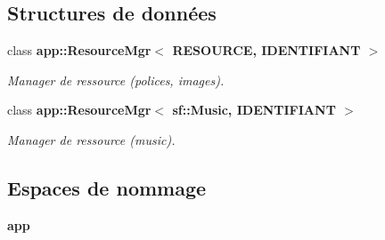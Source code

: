 \subsection*{Structures de données}
\begin{DoxyCompactItemize}
\item 
class {\bf app\+::\+Resource\+Mgr$<$ R\+E\+S\+O\+U\+R\+C\+E, I\+D\+E\+N\+T\+I\+F\+I\+A\+N\+T $>$}
\begin{DoxyCompactList}\small\item\em Manager de ressource (polices, images). \end{DoxyCompactList}\item 
class {\bf app\+::\+Resource\+Mgr$<$ sf\+::\+Music, I\+D\+E\+N\+T\+I\+F\+I\+A\+N\+T $>$}
\begin{DoxyCompactList}\small\item\em Manager de ressource (music). \end{DoxyCompactList}\end{DoxyCompactItemize}
\subsection*{Espaces de nommage}
\begin{DoxyCompactItemize}
\item 
 {\bf app}
\end{DoxyCompactItemize}

